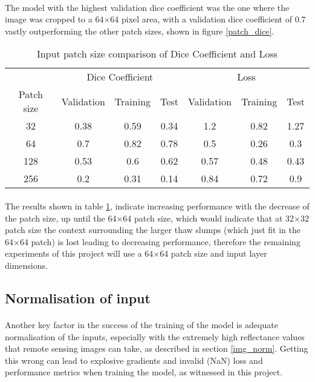 \paragraph{}
The model with the highest validation dice coefficient was the one where the image was cropped to a $64$×$64$ pixel area, with a validation dice coefficient of $0.7$ vastly outperforming the other patch sizes, shown in figure \ref{patch_dice}.
\begin{table}[ht!] 
    \begin{center}
    \begin{tabular}{ccccccc} 
    \toprule
       & \multicolumn{3}{c}{Dice Coefficient}     & \multicolumn{3}{c}{Loss} \\
    Patch size & Validation & Training & Test & Validation    & Training    & Test   \\ \midrule
32 & 0.38 & 0.59 & 0.34 & 1.2 & 0.82 & 1.27 \\ \rowcolor{lightgray} 64 & 0.7 & 0.82 & 0.78 & 0.5 & 0.26 & 0.3  \\ 128 & 0.53 & 0.6 & 0.62 & 0.57 & 0.48 & 0.43  \\ 256 & 0.2 & 0.31 & 0.14 & 0.84 & 0.72 & 0.9  \\
\bottomrule
    \end{tabular}
  \end{center} 
  \caption{Input patch size comparison of Dice Coefficient and Loss}\label{tab_patch}
\end{table}
\paragraph{}
The results shown in table \ref{tab_patch}, indicate increasing performance with the decrease of the patch size, up until the 64×64 patch size, which would indicate that at 32×32 patch size the context surrounding the larger thaw slumps (which just fit in the 64×64 patch) is lost leading to decreasing performance, therefore the remaining experiments of this project will use a 64×64 patch size and input layer dimensions.
\subsection{Normalisation of input}
\paragraph{}
Another key factor in the success of the training of the model is adequate normalisation of the inputs, especially with the extremely high reflectance values that remote sensing images can take, as described in section \ref{img_norm}. Getting this wrong can lead to explosive gradients and invalid (NaN) loss and performance metrics when training the model, as witnessed in this project.

